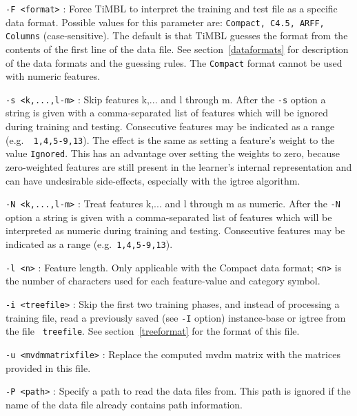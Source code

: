 \documentclass{report}
\begin{document}
\begin{description}

\item {\tt -F <format>} : Force TiMBL to interpret the training and
test file as a specific data format. Possible values for this
parameter are: {\tt Compact, C4.5, ARFF, Columns}
(case-sensitive). The default is that TiMBL guesses the format from
the contents of the first line of the data file. See
section~\ref{dataformats} for description of the data formats and the
guessing rules. The {\tt Compact} format cannot be used with numeric
features.

\item {\tt -s <k,...,l-m>} : Skip features k,... and l through m. After
the {\tt -s} option a string is given with a comma-separated list of
features which will be ignored during training and
testing. Consecutive features may be indicated as a range (e.g.~{\tt
1,4,5-9,13}). The effect is the same as setting a feature's weight to
the value {\tt Ignored}. This has an advantage over setting the
weights to zero, because zero-weighted features are still present in
the learner's internal representation and can have undesirable
side-effects, especially with the {\sc igtree} algorithm.

\item {\tt -N <k,...,l-m>} : Treat features k,... and l through m as
numeric. After the {\tt -N} option a string is given with a
comma-separated list of features which will be interpreted as numeric
during training and testing. Consecutive features may be
indicated as a range (e.g.~{\tt 1,4,5-9,13}).

\item {\tt -l <n>} : Feature length. Only applicable with the Compact
data format; {\tt <n>} is the number of characters used for each
feature-value and category symbol.

\item {\tt -i <treefile>} : Skip the first two training phases, and
instead of processing a training file, read a previously saved (see
{\tt -I} option) instance-base or {\sc igtree} from the file {\tt
treefile}. See section~\ref{treeformat} for the format of this file.

\item {\tt -u <mvdmmatrixfile>} : Replace the computed {\sc mvdm} matrix
with the matrices provided in this file.

\item {\tt -P <path>} : Specify a path to read the data files
from. This path is ignored if the name of the data file already
contains path information.

\end{description}
\end{document}
